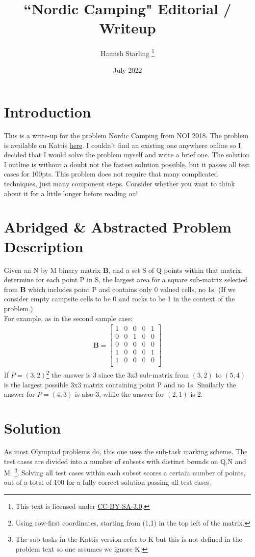 \documentclass{article}
\title{``Nordic Camping" Editorial / Writeup}
\author{Hamish Starling \footnote{This text is licensed under \href{https://creativecommons.org/licenses/by-sa/3.0/}{CC-BY-SA-3.0}.}
}
\date{July 2022}
\begin{document}
\maketitle

\section{Introduction}
This is a write-up for the problem Nordic Camping from NOI 2018. The problem is available on Kattis \href{https://open.kattis.com/problems/camping}{here}. I couldn't find an existing one anywhere online so I decided that I would solve the problem myself and write a brief one. The solution I outline is without a doubt not the fastest solution possible, but it passes all test cases for 100pts. This problem does not require that many complicated techniques, just many component steps. Consider whether you want to think about it for a little longer before reading on!

\section{Abridged \& Abstracted Problem Description}
Given an N by M binary matrix \textbf{B}, and a set S of Q points within that matrix, determine for each point P in S, the largest area for a square sub-matrix selected from \textbf{B} which includes point P and contains only 0 valued cells, no 1s. (If we consider empty campsite cells to be 0 and rocks to be 1 in the context of the problem.) \\

\noindent For example, as in the second sample case:
\begin{align*}
    \mathbf{B}= \begin{bmatrix}
1 & 0 & 0 & 0 & 1\\
0 & 0 & 1 & 0 & 0\\
0 & 0 & 0 & 0 & 0\\
1 & 0 & 0 & 0 & 1\\
1 & 0 & 0 & 0 & 0\\
\end{bmatrix}
\end{align*}
If $P = (3,2)$\footnote{Using row-first coordinates, starting from (1,1) in the top left of the matrix.} the answer is 3 since the 3x3 sub-matrix from $(3,2)$ to $(5,4)$ is the largest possible 3x3 matrix containing point P and no 1s. Similarly the answer for $P = (4,3)$ is also 3, while the answer for $(2,1)$ is 2.

\section{Solution}
As most Olympiad problems do, this one uses the sub-task marking scheme. The test cases are divided into a number of subsets with distinct bounds on Q,N and M. \footnote{The sub-tasks in the Kattis version refer to K but this is not defined in the problem text so one assumes we ignore K.}. Solving all test cases within each subset scores a certain number of points, out of a total of 100 for a fully correct solution passing all test cases.
\end{document}
